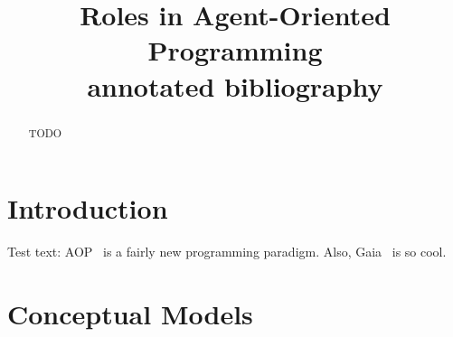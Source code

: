 \documentclass{article}
\title{Roles in Agent-Oriented Programming\\[1ex]\small{annotated bibliography}}
\begin{document}
\maketitle

\begin{abstract}
TODO
\end{abstract}

\section{Introduction}

Test text:
AOP~\cite{journals/ai/Shoham93} is a fairly new programming paradigm.
Also, Gaia~\cite{journals/aamas/WooldridgeJK00} is so cool.

\section{Conceptual Models}



\end{document}
